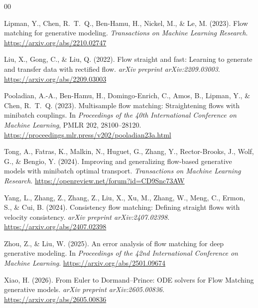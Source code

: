 \documentclass[final,5p,times,twocolumn,authoryear]{elsarticle}
\begin{document}
\begin{thebibliography}{00}

Lipman, Y., Chen, R.~T.~Q., Ben-Hamu, H., Nickel, M., \& Le, M. (2023).
Flow matching for generative modeling.
\textit{Transactions on Machine Learning Research}.
\url{https://arxiv.org/abs/2210.02747}

Liu, X., Gong, C., \& Liu, Q. (2022).
Flow straight and fast: Learning to generate and transfer data with rectified flow.
\textit{arXiv preprint arXiv:2209.03003}.
\url{https://arxiv.org/abs/2209.03003}

Pooladian, A.-A., Ben-Hamu, H., Domingo-Enrich, C., Amos, B., Lipman, Y., \& Chen, R.~T.~Q. (2023).
Multisample flow matching: Straightening flows with minibatch couplings.
In \textit{Proceedings of the 40th International Conference on Machine Learning}, PMLR 202, 28100--28120.
\url{https://proceedings.mlr.press/v202/pooladian23a.html}

Tong, A., Fatras, K., Malkin, N., Huguet, G., Zhang, Y., Rector-Brooks, J., Wolf, G., \& Bengio, Y. (2024).
Improving and generalizing flow-based generative models with minibatch optimal transport.
\textit{Transactions on Machine Learning Research}.
\url{https://openreview.net/forum?id=CD9Snc73AW}

Yang, L., Zhang, Z., Zhang, Z., Liu, X., Xu, M., Zhang, W., Meng, C., Ermon, S., \& Cui, B. (2024).
Consistency flow matching: Defining straight flows with velocity consistency.
\textit{arXiv preprint arXiv:2407.02398}.
\url{https://arxiv.org/abs/2407.02398}

Zhou, Z., \& Liu, W. (2025).
An error analysis of flow matching for deep generative modeling.
In \textit{Proceedings of the 42nd International Conference on Machine Learning}.
\url{https://arxiv.org/abs/2501.09674}

Xiao, H. (2026).
From Euler to Dormand--Prince: ODE solvers for Flow Matching generative models.
\textit{arXiv preprint arXiv:2605.00836}.
\url{https://arxiv.org/abs/2605.00836}

\end{thebibliography}
\end{document}
